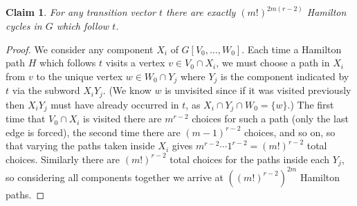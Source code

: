 \documentclass[12pt]{article}
\newtheorem{claim}{Claim}
\begin{document}
\begin{claim} \label{Hamilton cycles following t}
For any transition vector $t$ there are exactly $(m!)^{2m(r-2)}$ Hamilton cycles in $G$ which follow $t$.
\end{claim}
\begin{proof}
    We consider any component $X_i$ of $G[V_0,\ldots,W_0]$. Each time a Hamilton path $H$ which follows $t$ visits a vertex $v\in V_0\cap X_i$, we must choose a path in $X_i$ from $v$ to the unique vertex $w\in W_0\cap Y_j$ where $Y_j$ is the component indicated by $t$ via the subword $X_iY_j$. (We know $w$ is unvisited since if it was visited previously then $X_iY_j$ must have already occurred in $t$, as $X_i\cap Y_j\cap W_0=\{w\}$.) The first time that $V_0\cap X_i$ is visited there are $m^{r-2}$ choices for such a path (only the last edge is forced), the second time there are $(m-1)^{r-2}$ choices, and so on, so that varying the paths taken inside $X_i$ gives $m^{r-2}\cdots 1^{r-2}=(m!)^{r-2}$ total choices. Similarly there are $(m!)^{r-2}$ total choices for the paths inside each $Y_j$, so considering all components together we arrive at $((m!)^{r-2})^{2m}$ Hamilton paths.
\end{proof}
\end{document}
